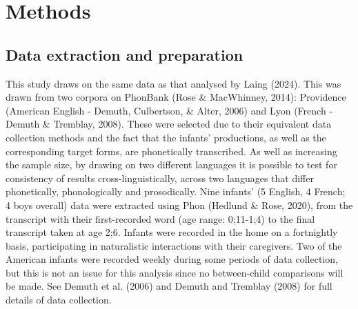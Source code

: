 \documentclass[
  man]{apa6}
\begin{document}
\section{Methods}\label{methods}

\subsection{Data extraction and preparation}\label{data-extraction-and-preparation}

This study draws on the same data as that analysed by Laing (2024). This was drawn from two corpora on PhonBank (Rose \& MacWhinney, 2014): Providence (American English - Demuth, Culbertson, \& Alter, 2006) and Lyon (French - Demuth \& Tremblay, 2008). These were selected due to their equivalent data collection methods and the fact that the infants' productions, as well as the corresponding target forms, are phonetically transcribed. As well as increasing the sample size, by drawing on two different languages it is possible to test for consistency of results cross-linguistically, across two languages that differ phonetically, phonologically and prosodically. Nine infants' (5 English, 4 French; 4 boys overall) data were extracted using Phon (Hedlund \& Rose, 2020), from the transcript with their first-recorded word (age range: 0;11-1;4) to the final transcript taken at age 2;6. Infants were recorded in the home on a fortnightly basis, participating in naturalistic interactions with their caregivers. Two of the American infants were recorded weekly during some periods of data collection, but this is not an issue for this analysis since no between-child comparisons will be made. See Demuth et al. (2006) and Demuth and Tremblay (2008) for full details of data collection.
\end{document}
